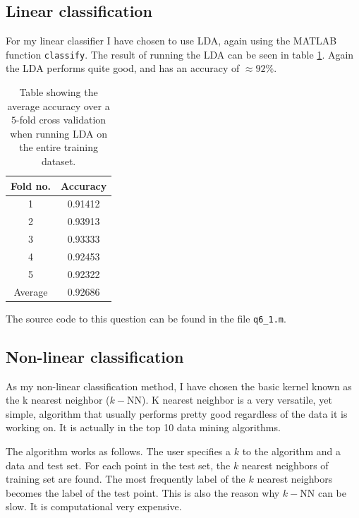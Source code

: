 \documentclass[10pt]{article}
\begin{document}
\subsection*{Linear classification} %
\label{sub:linear_classification2}

For my linear classifier I have chosen to use LDA, again using the MATLAB function \texttt{classify}. The result of running the LDA can be seen in table \ref{table3}. Again the LDA performs quite good, and has an accuracy of $\approx 92\%$. 

\begin{table}
  \begin{center}  
    \begin{tabular}{ | c | c |}
      \hline
      Fold no. & Accuracy\\
      \hline
      1    &     0.91412\\
      2    &     0.93913\\
      3    &     0.93333\\
      4    &     0.92453\\
      5    &     0.92322\\
      \hline
      Average &  0.92686 \\
      \hline
    \end{tabular}
    \caption{Table showing the average accuracy over a $5$-fold cross validation when running LDA on the entire training dataset.}
    \label{table3}
  \end{center}    
\end{table}   




The source code to this question can be found in the file \texttt{q6\_1.m}.



\subsection*{Non-linear classification} %
\label{sub:non_linear_classification2}
As my non-linear classification method, I have chosen the basic kernel known as the k nearest neighbor ($k-$NN). K nearest neighbor is a very versatile, yet simple, algorithm that usually performs pretty good regardless of the data it is working on. It is actually in the top 10 data mining algorithms\cite{Wu07doi10.1007/s10115-007-0114-2}.

The algorithm works as follows. The user specifies a $k$ to the algorithm and a data and test set. For each point in the test set, the $k$ nearest neighbors of training set are found. The most frequently label of the $k$ nearest neighbors becomes the label of the test point. This is also the reason why $k-$NN can be slow. It is computational very expensive.
\end{document}
